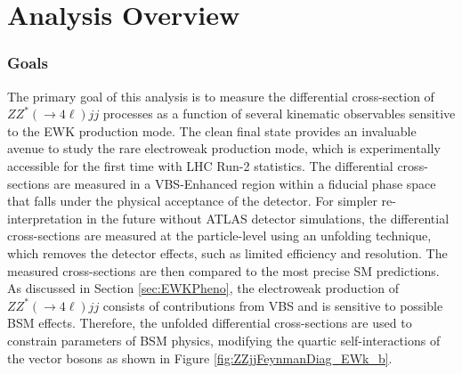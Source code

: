 \part {Analysis Overview}
\label{sec:AnalysisOverview}

\section{Goals}
\label{sec:Analysis_Goals}

The primary goal of this analysis is to measure the differential cross-section of $ZZ^*(\rightarrow 4\ell) jj$ processes as a function of several kinematic observables sensitive to the EWK production mode. The clean final state provides an invaluable avenue to study the rare electroweak production mode, which is experimentally accessible for the first time with LHC Run-2 statistics. The differential cross-sections are measured in a VBS-Enhanced region within a fiducial phase space that falls under the physical acceptance of the detector. For simpler re-interpretation in the future without ATLAS detector simulations, the differential cross-sections are measured at the particle-level using an unfolding technique, which removes the detector effects, such as limited efficiency and resolution. The measured cross-sections are then compared to the most precise SM predictions. As discussed in Section \ref{sec:EWKPheno}, the electroweak production of $ZZ^*(\rightarrow 4\ell) jj$ consists of contributions from VBS and is sensitive to possible BSM effects. Therefore, the unfolded differential cross-sections are used to constrain parameters of BSM physics, modifying the quartic self-interactions of the vector bosons as shown in Figure \ref{fig:ZZjjFeynmanDiag_EWk_b}.